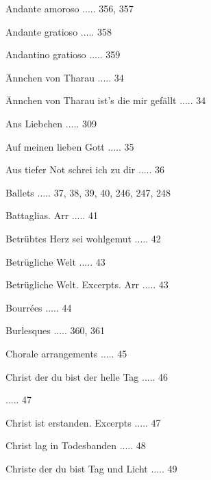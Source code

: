 \documentclass[twocolumn]{book}
\begin{document}
\newline 
Andante amoroso ..... 356, 357

\newline 
Andante gratioso ..... 358

\newline 
Andantino gratioso ..... 359

\newline 
Ännchen von Tharau ..... 34

\newline 
Ännchen von Tharau ist's die mir gefällt ..... 34

\newline 
Ans Liebchen ..... 309

\newline 
Auf meinen lieben Gott ..... 35

\newline 
Aus tiefer Not schrei ich zu dir ..... 36

\newline 
Ballets ..... 37, 38, 39, 40, 246, 247, 248

\newline 
Battaglias. Arr ..... 41

\newline 
Betrübtes Herz sei wohlgemut ..... 42

\newline 
Betrügliche Welt ..... 43

\newline 
Betrügliche Welt. Excerpts. Arr ..... 43

\newline 
Bourrées ..... 44

\newline 
Burlesques ..... 360, 361

\newline 
Chorale arrangements ..... 45

\newline 
Christ der du bist der helle Tag ..... 46

 ..... 47

\newline 
Christ ist erstanden. Excerpts ..... 47

\newline 
Christ lag in Todesbanden ..... 48

\newline 
Christe der du bist Tag und Licht ..... 49
\end{document}
